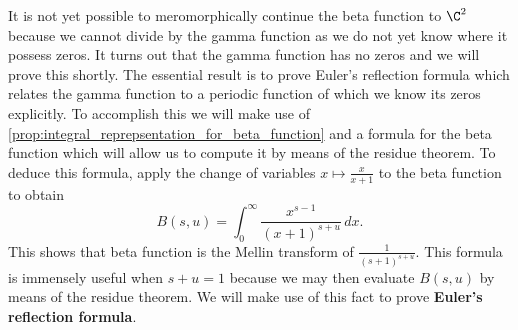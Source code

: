 \documentclass[12pt]{article}
\begin{document}
    It is not yet possible to meromorphically continue the beta function to \(\C^{2}\) because we cannot divide by the gamma function as we do not yet know where it possess zeros. It turns out that the gamma function has no zeros and we will prove this shortly. The essential result is to prove Euler's reflection formula which relates the gamma function to a periodic function of which we know its zeros explicitly. To accomplish this we will make use of \cref{prop:integral_reprepsentation_for_beta_function} and a formula for the beta function which will allow us to compute it by means of the residue theorem. To deduce this formula, apply the change of variables \(x \mapsto \frac{x}{x+1}\) to the beta function to obtain
    \begin{equation}\label{equ:residue_form_beta_function}
      B(s,u) = \int_{0}^{\infty}\frac{x^{s-1}}{(x+1)^{s+u}}\,dx.
    \end{equation}
    This shows that beta function is the Mellin transform of \(\frac{1}{(s+1)^{s+u}}\). This formula is immensely useful when \(s+u = 1\) because we may then evaluate \(B(s,u)\) by means of the residue theorem. We will make use of this fact to prove \textbf{Euler's reflection formula}.
\end{document}
